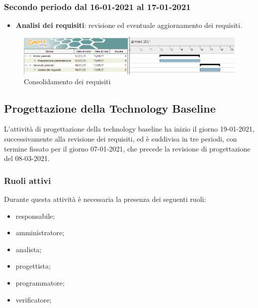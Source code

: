 \documentclass[]{article}
\begin{document}
	\subsubsection{Secondo periodo dal 16-01-2021 al 17-01-2021}
	\begin{itemize}
		
	\item \textbf{Analisi dei requisiti}: revisione ed eventuale aggiornamento dei requisiti.
		
	\end{itemize}

	\newpage
	
	\begin{figure}[h!]
	\includegraphics[width=1.7\textwidth, left]{images/2_Consolidamento_dei_requisiti.png}
	\caption{Consolidamento dei requisiti}
	\end{figure}

	\newpage

	
	\subsection{Progettazione della Technology Baseline}
	L’attività di progettazione della technology baseline ha inizio il giorno 19-01-2021, successivamente
	alla revisione dei requisiti, ed è suddivisa in tre periodi, con termine fissato per il giorno 07-01-2021,
	che precede la revisione di progettazione del 08-03-2021.
	
	\subsubsection{Ruoli attivi}
	Durante questa attività è necessaria la presenza dei seguenti ruoli:
	\begin{itemize}
	\item responsabile;
	\item amministratore;
	\item analista;
	\item progettista;
	\item programmatore;
	\item verificatore;
	\end{itemize}
\end{document}
